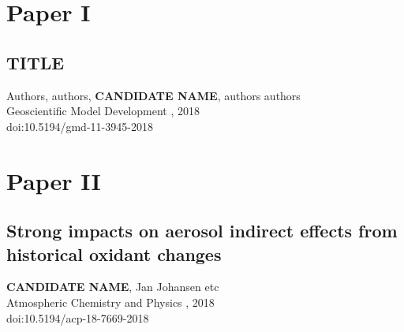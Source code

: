 \label{ch:the_actual_papers}

\chapter*{Paper I}
\section*{TITLE }
%
%
\noindent Authors, authors, \textbf{CANDIDATE NAME}, authors authors \\
%
\noindent Geoscientific Model Development , 2018 \\
%
\noindent doi:10.5194/gmd-11-3945-2018
%

\cleardoublepage
%


\chapter*{Paper II}
\section*{Strong impacts on aerosol indirect effects from historical oxidant changes}
%
%
\noindent \textbf{CANDIDATE NAME}, Jan Johansen etc \\
%
\noindent Atmospheric Chemistry and Physics , 2018 \\
%
\noindent doi:10.5194/acp-18-7669-2018

